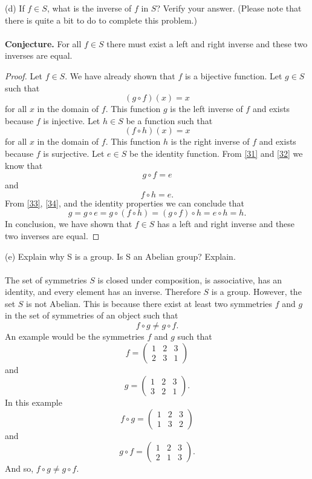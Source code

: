 \documentclass[11pt,a4paper]{article}
\begin{document}
(d) If $f\in S$, what is the inverse of $f$ in $S$? Verify your answer. (Please note
that there is quite a bit to do to complete this problem.)\\
~\\
{\bf Conjecture.} For all $f\in S$ there must exist a left and right inverse and these two inverses are equal.
\begin{proof}
Let $f\in S$. We have already shown that $f$ is a bijective function. Let $g\in S$ such that
\begin{equation}\label{31}
(g\circ f)(x) = x
\end{equation}
for all $x$ in the domain of $f$. This function $g$ is the left inverse of $f$ and exists because $f$ is injective. Let $h\in S$ be a function such that
\begin{equation}\label{32}
(f\circ h)(x) = x
\end{equation}
for all $x$ in the domain of $f$. This function $h$ is the right inverse of $f$ and exists because $f$ is surjective. Let $e\in S$ be the identity function. From \eqref{31} and \eqref{32} we know that
\begin{equation}\label{33}
g\circ f = e
\end{equation}
and
\begin{equation}\label{34}
f\circ h = e.
\end{equation}
From \eqref{33}, \eqref{34}, and the identity properties we can conclude that
\[g = g\circ e = g\circ(f\circ h) = (g\circ f)\circ h = e\circ h = h.\]
In conclusion, we have shown that $f\in S$ has a left and right inverse and these two inverses are equal.
\end{proof}
(e) Explain why S is a group. Is S an Abelian group? Explain.\\
~\\
The set of symmetries $S$ is closed under composition, is associative, has an identity, and every element has an inverse. Therefore $S$ is a group. However, the set $S$ is not Abelian. This is because there exist at least two symmetries $f$ and $g$ in the set of symmetries of an object such that
\[f\circ g \neq g\circ f.\]
An example would be the symmetries $f$ and $g$ such that
\[f=\left(\begin{array}{ccc}
1&2&3\\
2&3&1
\end{array}\right)\]
and
\[g=\left(\begin{array}{ccc}
1&2&3\\
3&2&1
\end{array}\right).\]
In this example
\[f\circ g = \left(\begin{array}{ccc}
1&2&3\\
1&3&2
\end{array}\right)\]
and
\[g\circ f = \left(\begin{array}{ccc}
1&2&3\\
2&1&3
\end{array}\right).\]
And so, $f\circ g \neq g\circ f$.
\end{document}
